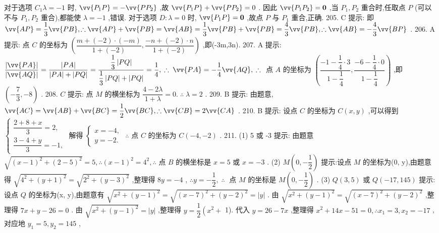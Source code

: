 对于选项 ${C}_{1}\lambda  =  - 1$ 时, $\vv{{P}_{1}P} =  - \vv{P{P}_{2}}$ ,故 $\vv{{P}_{1}P} + \vv{P{P}_{2}} = 0$ . 因此 $\vv{{P}_{1}{P}_{2}} = \mathbf{0}$ ,当 ${P}_{1},{P}_{2}$ 重合时,任取点 $P$ (可以不与 ${P}_{1},{P}_{2}$ 重合),都能使 $\lambda  =  - 1$ ,错误. 对于选项 $D : \lambda  = 0$ 时, $\vv{{P}_{1}P} = \mathbf{0}$ ,故点 $P$ 与 ${P}_{1}$ 重合,正确. 205. C 提示: 即 $\vv{AP} = \dfrac{1}{3}\vv{PB},\therefore \vv{AP} + \vv{PB} = \vv{AB} = \dfrac{1}{3}\vv{PB} + \vv{PB} = \dfrac{4}{3}\vv{PB},\therefore \vv{AB} =  - \dfrac{4}{3}\vv{BP}$ . 206. A 提示: 点 $C$ 的坐标为 $\left( {\dfrac{m + \left( {-2}\right)  \cdot  \left( {-m}\right) }{1 + \left( {-2}\right) },\dfrac{-n + \left( {-2}\right)  \cdot  n}{1 + \left( {-2}\right) }}\right)$ ,即(-3m,3n). 207. A 提示: $\dfrac{\left| \vv{PA}\right| }{\left| \vv{AQ}\right| } = \dfrac{\left| PA\right| }{\left| {PA}\right|  + \left| {PQ}\right| } = \dfrac{\dfrac{1}{3}\left| {PQ}\right| }{\dfrac{1}{3}\left| {PQ}\right|  + \left| {PQ}\right| } = \dfrac{1}{4},\;\therefore \;\vv{PA} =  - \dfrac{1}{4}\vv{AQ},\;\therefore \;$ 点 $A$ 的坐标为 $\left( {\dfrac{-1 - \dfrac{1}{4} \cdot  3}{1 - \dfrac{1}{4}},\dfrac{-6 - \dfrac{1}{4} \cdot  0}{1 - \dfrac{1}{4}}}\right)$ ,即 $\left( {-\dfrac{7}{3}, - 8}\right)$ . 208. $C$ 提示: 点 $M$ 的横坐标为 $\dfrac{4 - {2\lambda }}{1 + \lambda } = 0.\;\therefore \;\lambda  = 2$ . 209. B 提示: 由题意, $\vv{AC} = \vv{AB} + \vv{BC} = \dfrac{1}{2}\vv{BC},\therefore \vv{CB} = 2\vv{CA}$ . 210. B 提示: 设点 $C$ 的坐标为 $C\left( {x,y}\right)$ ,可以得到 $\left\{  \begin{array}{l} \dfrac{2 + 8 + x}{3} = 2, \\  \dfrac{3 - 4 + y}{3} =  - 1, \end{array}\right.$ 解得 $\left\{  \begin{array}{l} x =  - 4, \\  y =  - 2. \end{array}\right.$  $\therefore$ 点 $C$ 的坐标为 $C\left( {-4, - 2}\right)$ . 211. (1) 5 或 -3 提示: 由题意 $\sqrt{{\left( x - 1\right) }^{2} + {\left( 2 - 5\right) }^{2}} = 5,\therefore {\left( x - 1\right) }^{2} = {4}^{2},\therefore$ 点 $B$ 的横坐标是 $x = 5$ 或 $x =  - 3$ . (2) $M\left( {0, - \dfrac{1}{2}}\right)$ 提示:设点 $M$ 的坐标为(0, y),由题意得 $\sqrt{{4}^{2} + {\left( y + 1\right) }^{2}} = \sqrt{{2}^{2} + {\left( y - 3\right) }^{2}}$ ,整理得 ${8y} =  - 4$ , $\therefore y =  - \dfrac{1}{2},\;\therefore \;$ 点 $M$ 的坐标是 $M\left( {0, - \dfrac{1}{2}}\right)$ . (3) $Q\left( {3,5}\right)$ 或 $Q\left( {-{17},{145}}\right)$ 提示:设点 $Q$ 的坐标为(x, y),由题意有 $\sqrt{{x}^{2} + {\left( y - 1\right) }^{2}} = \sqrt{{\left( x - 7\right) }^{2} + {\left( y - 2\right) }^{2}} = \left| y\right|$ . 由 $\sqrt{{x}^{2} + {\left( y - 1\right) }^{2}} = \sqrt{{\left( x - 7\right) }^{2} + {\left( y - 2\right) }^{2}}$ ,整理得 ${7x} + y - {26} = 0$ . 由 $\sqrt{{x}^{2} + {\left( y - 1\right) }^{2}} = \left| y\right|$ ,整理得 $y = \dfrac{1}{2}\left( {{x}^{2} + }\right.$ 1). 代入 $y = {26} - {7x}$ ,整理得 ${x}^{2} + {14x} - {51} = 0,\therefore {x}_{1} = 3,{x}_{2} =  - {17}$ ,对应地 ${y}_{1} = 5,{y}_{2} = {145}$ ,

